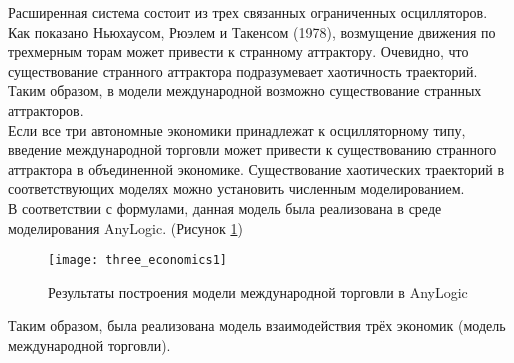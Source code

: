 \newpage

Расширенная система состоит из трех связанных ограниченных осцилляторов. Как показано Ньюхаусом, Рюэлем и Такенсом (1978), возмущение движения по трехмерным торам может привести к странному аттрактору. Очевидно, что существование странного аттрактора подразумевает хаотичность траекторий. Таким образом, в модели международной возможно существование странных аттракторов.\\

Если все три автономные экономики принадлежат к осцилляторному типу, введение международной торговли может привести к существованию странного аттрактора в объединенной экономике. Существование хаотических траекторий в соответствующих моделях можно установить численным моделированием.\\

В соответствии с формулами, данная модель была реализована в среде моделирования AnyLogic. (Рисунок \ref{fig:three_economics1})
\begin{figure}[h]
	\centering \texttt{[image: three\_economics1]}
	\caption{Результаты построения модели международной торговли в AnyLogic}
	\label{fig:three_economics1}
\end{figure}

Таким образом, была реализована модель взаимодействия трёх экономик (модель международной торговли).